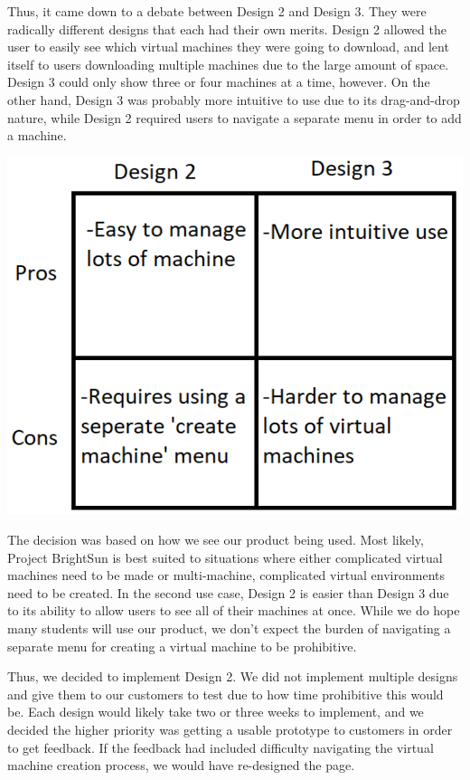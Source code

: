 \documentclass[openright]{report}
\begin{document}
\par Thus, it came down to a debate between Design 2 and Design 3. They were radically different designs that each had their own merits. Design 2 allowed the user to easily see which virtual machines they were going to download, and lent itself to users downloading multiple machines due to the large amount of space. Design 3 could only show three or four machines at a time, however. On the other hand, Design 3 was probably more intuitive to use due to its drag-and-drop nature, while Design 2 required users to navigate a separate menu in order to add a machine.

\begin{center}
    \includegraphics[scale=0.64]{images/proscons.png}
\end{center}

\par The decision was based on how we see our product being used. Most likely, Project BrightSun is best suited to situations where either complicated virtual machines need to be made or multi-machine, complicated virtual environments need to be created. In the second use case, Design 2 is easier than Design 3 due to its ability to allow users to see all of their machines at once. While we do hope many students will use our product, we don't expect the burden of navigating a separate menu for creating a virtual machine to be prohibitive.

\par Thus, we decided to implement Design 2. We did not implement multiple designs and give them to our customers to test due to how time prohibitive this would be. Each design would likely take two or three weeks to implement, and we decided the higher priority was getting a usable prototype to customers in order to get feedback. If the feedback had included difficulty navigating the virtual machine creation process, we would have re-designed the page.
\end{document}
